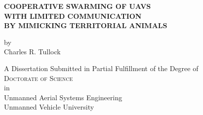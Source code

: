 
\begin{titlepage}
	\begin{center}

		\vspace*{1cm}
		 
		\large{ \textbf{ \uppercase{Cooperative swarming of UAVs\\with limited communication\\ by mimicking territorial animals}}}

		
		
		
		\vspace{1.5cm}
		
		by\\
		Charles R. Tullock\\
		
		\vspace{1.5cm}

		A Dissertation Submitted in Partial Fulfillment of the Degree of\\
		\large{\textsc{Doctorate of Science}}\\
		in\\
		\large{Unmanned Aerial Systems Engineering}\\
		\vspace{1cm}
		\large{Unmanned Vehicle University}\\		
		

\end{center}
\end{titlepage}
